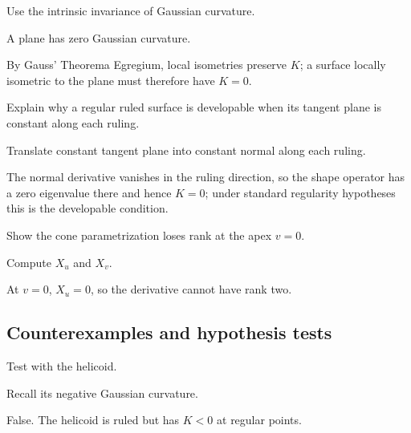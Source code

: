 \begin{exercise}[Developable local isometry implies \(K=0\)]\label{exr:vii18-ped-07}
Use the intrinsic invariance of Gaussian curvature.
\end{exercise}
\begin{hint}
A plane has zero Gaussian curvature.
\end{hint}
\begin{solution}
By Gauss' Theorema Egregium, local isometries preserve \(K\); a surface locally isometric to the plane must therefore have \(K=0\).
\end{solution}

\begin{exercise}\label{exr:vii18-ped-08}
Explain why a regular ruled surface is developable when its tangent plane is constant along each ruling.
\end{exercise}
\begin{hint}
Translate constant tangent plane into constant normal along each ruling.
\end{hint}
\begin{solution}
The normal derivative vanishes in the ruling direction, so the shape operator has a zero eigenvalue there and hence \(K=0\); under standard regularity hypotheses this is the developable condition.
\end{solution}

\begin{exercise}\label{exr:vii18-ped-09}
Show the cone parametrization loses rank at the apex \(v=0\).
\end{exercise}
\begin{hint}
Compute \(X_u\) and \(X_v\).
\end{hint}
\begin{solution}
At \(v=0\), \(X_u=0\), so the derivative cannot have rank two.
\end{solution}

\subsection*{Counterexamples and hypothesis tests}

\begin{exercise}\label{exr:vii18-ped-10}
Test with the helicoid.
\end{exercise}
\begin{hint}
Recall its negative Gaussian curvature.
\end{hint}
\begin{solution}
False.  The helicoid is ruled but has \(K<0\) at regular points.
\end{solution}

